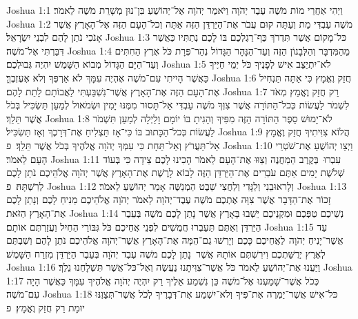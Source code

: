 Joshua 1:1	וַיְהִי אַחֲרֵי מוֹת מֹשֶׁה עֶבֶד יְהֹוָה וַיֹּאמֶר יְהֹוָה אֶל־יְהוֹשֻׁעַ בִּן־נוּן מְשָׁרֵת מֹשֶׁה לֵאמֹר׃
Joshua 1:2	מֹשֶׁה עַבְדִּי מֵת וְעַתָּה קוּם עֲבֹר אֶת־הַיַּרְדֵּן הַזֶּה אַתָּה וְכל־הָעָם הַזֶּה אֶל־הָאָרֶץ אֲשֶׁר אָנֹכִי נֹתֵן לָהֶם לִבְנֵי יִשְׂרָאֵל׃
Joshua 1:3	כּל־מָקוֹם אֲשֶׁר תִּדְרֹךְ כַּף־רַגְלְכֶם בּוֹ לָכֶם נְתַתִּיו כַּאֲשֶׁר דִּבַּרְתִּי אֶל־מֹשֶׁה׃
Joshua 1:4	מֵהַמִּדְבָּר וְהַלְּבָנוֹן הַזֶּה וְעַד־הַנָּהָר הַגָּדוֹל נְהַר־פְּרָת כֹּל אֶרֶץ הַחִתִּים וְעַד־הַיָּם הַגָּדוֹל מְבוֹא הַשָּׁמֶשׁ יִהְיֶה גְּבוּלְכֶם׃
Joshua 1:5	לֹא־יִתְיַצֵּב אִישׁ לְפָנֶיךָ כֹּל יְמֵי חַיֶּיךָ כַּאֲשֶׁר הָיִיתִי עִם־מֹשֶׁה אֶהְיֶה עִמָּךְ לֹא אַרְפְּךָ וְלֹא אֶעֶזְבֶךָּ׃
Joshua 1:6	חֲזַק וֶאֱמָץ כִּי אַתָּה תַּנְחִיל אֶת־הָעָם הַזֶּה אֶת־הָאָרֶץ אֲשֶׁר־נִשְׁבַּעְתִּי לַאֲבוֹתָם לָתֵת לָהֶם׃
Joshua 1:7	רַק חֲזַק וֶאֱמַץ מְאֹד לִשְׁמֹר לַעֲשׂוֹת כְּכל־הַתּוֹרָה אֲשֶׁר צִוְּךָ מֹשֶׁה עַבְדִּי אַל־תָּסוּר מִמֶּנּוּ יָמִין וּשְׂמֹאול לְמַעַן תַּשְׂכִּיל בְּכֹל אֲשֶׁר תֵּלֵךְ׃
Joshua 1:8	לֹא־יָמוּשׁ סֵפֶר הַתּוֹרָה הַזֶּה מִפִּיךָ וְהָגִיתָ בּוֹ יוֹמָם וָלַיְלָה לְמַעַן תִּשְׁמֹר לַעֲשׂוֹת כְּכל־הַכָּתוּב בּוֹ כִּי־אָז תַּצְלִיחַ אֶת־דְּרָכֶךָ וְאָז תַּשְׂכִּיל׃
Joshua 1:9	הֲלוֹא צִוִּיתִיךָ חֲזַק וֶאֱמָץ אַל־תַּעֲרֹץ וְאַל־תֵּחָת כִּי עִמְּךָ יְהֹוָה אֱלֹהֶיךָ בְּכֹל אֲשֶׁר תֵּלֵךְ׃ {פ}
Joshua 1:10	וַיְצַו יְהוֹשֻׁעַ אֶת־שֹׁטְרֵי הָעָם לֵאמֹר׃
Joshua 1:11	עִבְרוּ  בְּקֶרֶב הַמַּחֲנֶה וְצַוּוּ אֶת־הָעָם לֵאמֹר הָכִינוּ לָכֶם צֵידָה כִּי בְּעוֹד  שְׁלֹשֶׁת יָמִים אַתֶּם עֹבְרִים אֶת־הַיַּרְדֵּן הַזֶּה לָבוֹא לָרֶשֶׁת אֶת־הָאָרֶץ אֲשֶׁר יְהֹוָה אֱלֹהֵיכֶם נֹתֵן לָכֶם לְרִשְׁתָּהּ׃ {פ}
Joshua 1:12	וְלָראוּבֵנִי וְלַגָּדִי וְלַחֲצִי שֵׁבֶט הַמְנַשֶּׁה אָמַר יְהוֹשֻׁעַ לֵאמֹר׃
Joshua 1:13	זָכוֹר אֶת־הַדָּבָר אֲשֶׁר צִוָּה אֶתְכֶם מֹשֶׁה עֶבֶד־יְהֹוָה לֵאמֹר יְהֹוָה אֱלֹהֵיכֶם מֵנִיחַ לָכֶם וְנָתַן לָכֶם אֶת־הָאָרֶץ הַזֹּאת׃
Joshua 1:14	נְשֵׁיכֶם טַפְּכֶם וּמִקְנֵיכֶם יֵשְׁבוּ בָּאָרֶץ אֲשֶׁר נָתַן לָכֶם מֹשֶׁה בְּעֵבֶר הַיַּרְדֵּן וְאַתֶּם תַּעַבְרוּ חֲמֻשִׁים לִפְנֵי אֲחֵיכֶם כֹּל גִּבּוֹרֵי הַחַיִל וַעֲזַרְתֶּם אוֹתָם׃
Joshua 1:15	עַד אֲשֶׁר־יָנִיחַ יְהֹוָה  לַאֲחֵיכֶם כָּכֶם וְיָרְשׁוּ גַם־הֵמָּה אֶת־הָאָרֶץ אֲשֶׁר־יְהֹוָה אֱלֹהֵיכֶם נֹתֵן לָהֶם וְשַׁבְתֶּם לְאֶרֶץ יְרֻשַּׁתְכֶם וִירִשְׁתֶּם אוֹתָהּ אֲשֶׁר  נָתַן לָכֶם מֹשֶׁה עֶבֶד יְהֹוָה בְּעֵבֶר הַיַּרְדֵּן מִזְרַח הַשָּׁמֶשׁ׃
Joshua 1:16	וַיַּעֲנוּ אֶת־יְהוֹשֻׁעַ לֵאמֹר כֹּל אֲשֶׁר־צִוִּיתָנוּ נַעֲשֶׂה וְאֶל־כּל־אֲשֶׁר תִּשְׁלָחֵנוּ נֵלֵךְ׃
Joshua 1:17	כְּכֹל אֲשֶׁר־שָׁמַעְנוּ אֶל־מֹשֶׁה כֵּן נִשְׁמַע אֵלֶיךָ רַק יִהְיֶה יְהֹוָה אֱלֹהֶיךָ עִמָּךְ כַּאֲשֶׁר הָיָה עִם־מֹשֶׁה׃
Joshua 1:18	כּל־אִישׁ אֲשֶׁר־יַמְרֶה אֶת־פִּיךָ וְלֹא־יִשְׁמַע אֶת־דְּבָרֶיךָ לְכֹל אֲשֶׁר־תְּצַוֶּנּוּ יוּמָת רַק חֲזַק וֶאֱמָץ׃ {פ}
